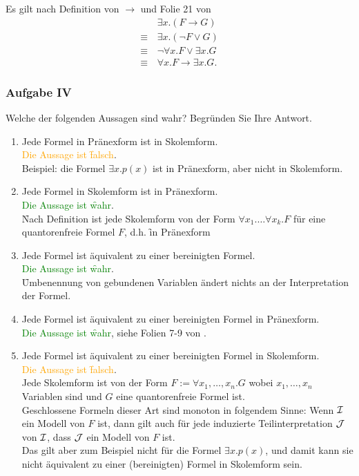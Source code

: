     \LOES Es gilt nach Definition von $\to$ und Folie 21 von 
    \begin{align*}
        & \exists x.(F \to G) \\
        \equiv \,& \exists x.(\lnot F \lor G) \\
        \equiv \,& \lnot \forall x.F \lor \exists x.G \\
        \equiv \,& \forall x.F \to \exists x.G.
    \end{align*}

\subsubsection*{Aufgabe IV}
    Welche der folgenden Aussagen sind wahr? Begründen Sie Ihre Antwort.
    \begin{enumerate}
        \item Jede Formel in Pränexform ist in Skolemform.\\
        \LOES \textcolor{orange}{Die Aussage ist \f{falsch}}. \\
        Beispiel: die Formel $\exists x.p(x)$ ist in Pränexform, aber nicht in Skolemform.

        \item Jede Formel in Skolemform ist in Pränexform. \\
        \LOES \textcolor{green}{Die Aussage ist \f{wahr}}.\\
        \f{Nach Definition ist jede Skolemform} von der Form $\forall x_1. \dots \forall x_k. F$ für eine quantorenfreie Formel $F$, d.h. \f{in Pränexform}

        \item Jede Formel ist äquivalent zu einer bereinigten Formel. \\
        \LOES \textcolor{green}{Die Aussage ist \f{wahr}}. \\
        \f{Umbenennung von gebundenen Variablen ändert nichts} an der Interpretation der Formel.

        \item Jede Formel ist äquivalent zu einer bereinigten Formel in Pränexform. \\
        \LOES \textcolor{green}{Die Aussage ist \f{wahr}}, siehe Folien 7-9 von .

        \item Jede Formel ist äquivalent zu einer bereinigten Formel in Skolemform. \\
        \LOES \textcolor{orange}{Die Aussage ist \f{falsch}}. \\
        Jede Skolemform ist von der Form $F := \forall x_1, \dots, x_n.G$ wobei $x_1, \dots, x_n$ Variablen sind und $G$ eine quantorenfreie Formel ist. \\
        Geschlossene Formeln dieser Art sind monoton in folgendem Sinne: Wenn $\mathcal{I}$ ein Modell von $F$ ist, dann gilt auch für jede induzierte Teilinterpretation $\mathcal{J}$ von $\mathcal{I}$, dass $\mathcal{J}$ ein Modell von $F$ ist. \\
        Das gilt aber zum Beispiel nicht für die Formel $\exists x.p(x)$, und damit kann sie nicht äquivalent zu einer (bereinigten) Formel in Skolemform sein.
    \end{enumerate}

